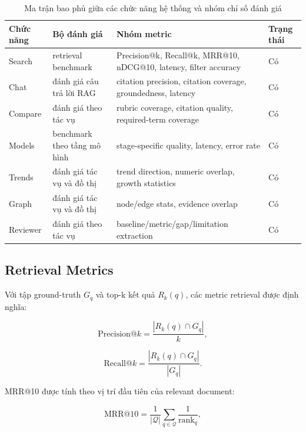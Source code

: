 \documentclass[conference]{IEEEtran}
\begin{document}
\begin{table}[t]
\caption{Ma trận bao phủ giữa các chức năng hệ thống và nhóm chỉ số đánh giá}
\label{tab:coverage}
\centering
\small
\begin{tabular}{p{}p{}p{}p{}}
\toprule
\textbf{Chức năng} & \textbf{Bộ đánh giá} & \textbf{Nhóm metric} & \textbf{Trạng thái}\\
\midrule
Search & retrieval benchmark & Precision@k, Recall@k, MRR@10, nDCG@10, latency, filter accuracy & Có\\
Chat & đánh giá câu trả lời RAG & citation precision, citation coverage, groundedness, latency & Có\\
Compare & đánh giá theo tác vụ & rubric coverage, citation quality, required-term coverage & Có\\
Models & benchmark theo tầng mô hình & stage-specific quality, latency, error rate & Có\\
Trends & đánh giá tác vụ và đồ thị & trend direction, numeric overlap, growth statistics & Có\\
Graph & đánh giá tác vụ và đồ thị & node/edge stats, evidence overlap & Có\\
Reviewer & đánh giá theo tác vụ & baseline/metric/gap/limitation extraction & Có\\
\bottomrule
\end{tabular}
\end{table}

\subsection{Retrieval Metrics}

Với tập ground-truth $G_q$ và top-k kết quả $R_k(q)$, các metric retrieval được định nghĩa:

\begin{equation}
\text{Precision@}k = \frac{|R_k(q)\cap G_q|}{k},
\end{equation}

\begin{equation}
\text{Recall@}k = \frac{|R_k(q)\cap G_q|}{|G_q|}.
\end{equation}

MRR@10 được tính theo vị trí đầu tiên của relevant document:

\begin{equation}
\text{MRR@10} = \frac{1}{|\mathcal{Q}|}\sum_{q\in\mathcal{Q}}\frac{1}{\text{rank}_q},
\end{equation}
\end{document}
